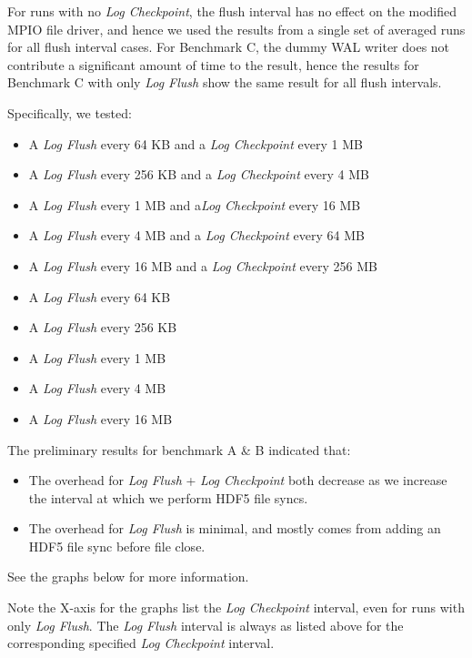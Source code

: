 For runs with no \textit{Log Checkpoint}, the flush interval has no effect on the modified MPIO file driver, and hence we used the results from a single set of averaged runs for all flush interval cases. For Benchmark C, the dummy WAL writer does not contribute a significant amount of time to the result, hence the results for Benchmark C with only \textit{Log Flush} show the same result for all flush intervals.

Specifically, we tested:
\begin{itemize}
    \item A \textit{Log Flush} every 64 KB and a \textit{Log Checkpoint} every 1 MB
    \item A \textit{Log Flush} every 256 KB and a \textit{Log Checkpoint} every 4 MB
    \item A \textit{Log Flush} every 1 MB and a\textit{Log Checkpoint} every 16 MB
    \item A \textit{Log Flush} every 4 MB and a \textit{Log Checkpoint} every 64 MB
    \item A \textit{Log Flush} every 16 MB and a \textit{Log Checkpoint} every 256 MB
    \item A \textit{Log Flush} every 64 KB
    \item A \textit{Log Flush} every 256 KB
    \item A \textit{Log Flush} every 1 MB
    \item A \textit{Log Flush} every 4 MB
    \item A \textit{Log Flush} every 16 MB
\end{itemize}

The preliminary results for benchmark A \& B indicated that:
\begin{itemize}
    \item The overhead for \textit{Log Flush} + \textit{Log Checkpoint} both decrease as we increase the interval at which we perform HDF5 file syncs.
    \item The overhead for \textit{Log Flush} is minimal, and mostly comes from adding an HDF5 file sync before file close.
\end{itemize}
See the graphs below for more information.

Note the X-axis for the graphs list the \textit{Log Checkpoint} interval, even for runs with only \textit{Log Flush}. The \textit{Log Flush} interval is always as listed above for the corresponding specified \textit{Log Checkpoint} interval.


